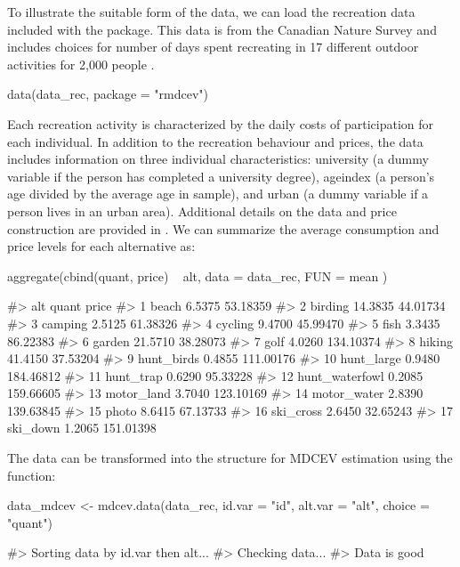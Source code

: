 To illustrate the suitable form of the data, we can load the recreation
data included with the  package. This data is from the
Canadian Nature Survey and includes choices for number of days spent
recreating in 17 different outdoor activities for 2,000 people
\citep{federal20122014}.

\begin{example}
data(data_rec, package = "rmdcev")
\end{example}

Each recreation activity is characterized by the daily costs of
participation for each individual. In addition to the recreation
behaviour and prices, the data includes information on three individual
characteristics: university (a dummy variable if the person has
completed a university degree), ageindex (a person's age divided by the
average age in sample), and urban (a dummy variable if a person lives in
an urban area). Additional details on the data and price construction
are provided in \citet{lloydsmitheconomics2020}. We can summarize the
average consumption and price levels for each alternative as:

\begin{example}
aggregate(cbind(quant, price) ~ alt, data = data_rec, FUN = mean )


#>               alt   quant     price
#> 1           beach  6.5375  53.18359
#> 2         birding 14.3835  44.01734
#> 3         camping  2.5125  61.38326
#> 4         cycling  9.4700  45.99470
#> 5            fish  3.3435  86.22383
#> 6          garden 21.5710  38.28073
#> 7            golf  4.0260 134.10374
#> 8          hiking 41.4150  37.53204
#> 9      hunt_birds  0.4855 111.00176
#> 10     hunt_large  0.9480 184.46812
#> 11      hunt_trap  0.6290  95.33228
#> 12 hunt_waterfowl  0.2085 159.66605
#> 13     motor_land  3.7040 123.10169
#> 14    motor_water  2.8390 139.63845
#> 15          photo  8.6415  67.13733
#> 16      ski_cross  2.6450  32.65243
#> 17       ski_down  1.2065 151.01398
\end{example}

The data can be transformed into the structure for MDCEV estimation
using the  function:

\begin{example}
data_mdcev <- mdcev.data(data_rec,
                       id.var = "id",
                       alt.var = "alt",
                       choice = "quant")

#> Sorting data by id.var then alt...
#> Checking data...
#> Data is good
\end{example}

